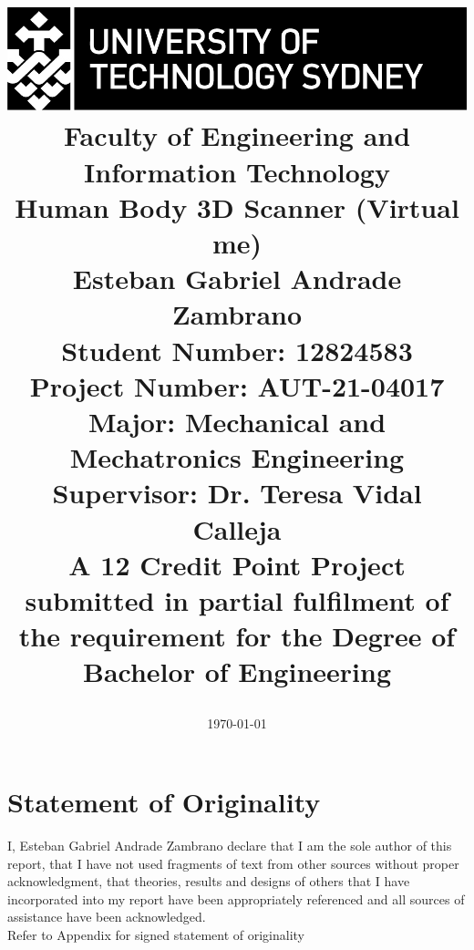 \documentclass[12pt]{report}
\author{}
\begin{document}
\begin{titlepage}

   

    \title{ \includegraphics[scale=1.7]{utslogo.jpg}\\[1cm]  
    Faculty of Engineering and Information Technology\\[1.0cm] 
    \Large{\textbf{Human Body 3D Scanner (Virtual me)}}\\[1.0cm] 
    {Esteban Gabriel Andrade Zambrano\\
    Student Number: 12824583\\
    Project Number: AUT-21-04017\\
    Major: Mechanical and Mechatronics Engineering\\
    Supervisor: Dr. Teresa Vidal Calleja\\[2.0cm]
    \small{A 12 Credit Point Project submitted in partial fulfilment of the requirement for the Degree of Bachelor of Engineering}
    }
    \date{\today}   
   }
   
\end{titlepage}
\maketitle  
\cleardoublepage

\chapter*{Statement of Originality}
I, Esteban Gabriel Andrade Zambrano  declare that I am the sole author of this report, that I have not used fragments of text from other sources without proper acknowledgment, that theories, results and designs of others that I have incorporated into my report have been appropriately referenced and all sources of assistance have been acknowledged.\\[2 cm]
Refer to Appendix for signed statement of originality
\end{document}
